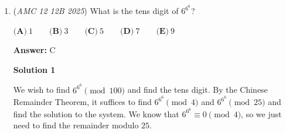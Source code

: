 \begin{enumerate}
 



\textbf{Solution 3 (Bash)}

Since $4+\sqrt{ 5 }$ is a root of polynomial, by definition
 \[(4+\sqrt{ 5 })^3-5(4+\sqrt{ 5 })^2+a(4+\sqrt{ 5 })+b=0=0+0\sqrt { 5 }\]Since $a,b\in \mathbb{Z}$, we can expand and compare coefficients,
 \[\begin{cases} 64+3\cdot 4 \cdot 5-5(4^2+5)+4a+b=0 \\ 3\cdot 16+5-5\cdot 2\cdot 4+a=0 \end{cases}\]Solving, $a=-13$, $b=-4a-19=33$, so $a+b=\boxed{\textbf{(C) } 20}$.

 



\textbf{Solution 4}

As explained in earlier solutions the given function $x^3 - 5x^2 + ax + b$ has roots $4+\sqrt{5}$, and $4-\sqrt{5}$. Therefore it should be divisible by $(4+\sqrt{5})(4-\sqrt{5})$ with no remainder.

 
 \[(4+\sqrt{5})(4-\sqrt{5})=x^2-8x+11\]
 \[\begin{array}{rll}     &\phantom{x^3 - 5x^2 + a}x + 3\\   \cline{2-3}   x^2 - 8x + 11 & \multicolumn{2}{|l}{x^3 - 5x^2 + ax + b} \\     & \underline{-(x^3 - 8x^2 + 11x)} \\     & \phantom{x^3 + } 3x^2 + (a-11)x + b \\     & \underline{\phantom{x^3} - (3x^2 - 24x + 33)} \\     & \phantom{x^3 + 3x^2 + } (a+13)x + (b-33) \end{array}\]
 \[(a+13)x + (b-33)=0\]So in order for $(a+13)x + (b-33)$ to be $0$ for all values of $x$ $(a+13)$&$(b-33)$ must each equal $0$. $(a=-13)$,$(b=33)$. $a+b=\boxed{\textbf{(C) } 20}$.

 


	\item (\textit{AMC 12 12B 2025}) What is the tens digit of $6^{6^6}$?


 $\textbf{(A)}~1 \qquad \textbf{(B)}~3 \qquad \textbf{(C)}~5 \qquad \textbf{(D)}~7 \qquad \textbf{(E)}~9$

 \textbf{Answer: }C



\textbf{Solution 1}

We wish to find $6^{6^6}\pmod{100}$ and find the tens digit. By the Chinese Remainder Theorem, it suffices to find $6^{6^6}\pmod{4}$ and $6^{6^6}\pmod{25}$ and find the solution to the system. We know that $6^{6^6}\equiv 0\pmod{4}$, so we just need to find the remainder modulo $25$.


\end{enumerate}
